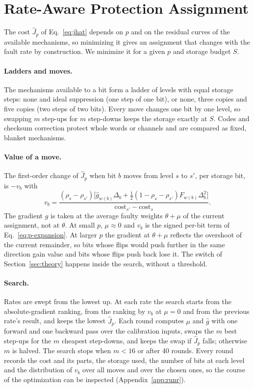 \section{Rate-Aware Protection Assignment}\label{sec:method}
The cost $\hat J_p$ of Eq.~\eqref{eq:jhat} depends on $p$ and on the residual curves of the available mechanisms, so minimizing it gives an assignment that changes with the fault rate by construction. We minimize it for a given $p$ and storage budget $S$.

\paragraph{Ladders and moves.} The mechanisms available to a bit form a ladder of levels with equal storage steps: none and ideal suppression (one step of one bit), or none, three copies and five copies (two steps of two bits). Every move changes one bit by one level, so swapping $m$ step-ups for $m$ step-downs keeps the storage exactly at $S$. Codes and checksum correction protect whole words or channels and are compared as fixed, blanket mechanisms.

\paragraph{Value of a move.} The first-order change of $\hat J_p$ when bit $b$ moves from level $s$ to $s'$, per storage bit, is $-v_b$ with
\begin{equation}\label{eq:value}
v_b=\frac{(\rho_s-\rho_{s'})\big[\hat g_{w(b)}\Delta_b+\tfrac12(1-\rho_s-\rho_{s'})F_{w(b)}\Delta_b^2\big]}{\mathrm{cost}_{s'}-\mathrm{cost}_s}.
\end{equation}
The gradient $\hat g$ is taken at the average faulty weights $\theta+\mu$ of the current assignment, not at $\theta$. At small $p$, $\mu\approx0$ and $v_b$ is the signed per-bit term of Eq.~\eqref{eq:p-expansion}. At larger $p$ the gradient at $\theta+\mu$ reflects the overshoot of the current remainder, so bits whose flips would push further in the same direction gain value and bits whose flips push back lose it. The switch of Section~\ref{sec:theory} happens inside the search, without a threshold.

\paragraph{Search.} Rates are swept from the lowest up. At each rate the search starts from the absolute-gradient ranking, from the ranking by $v_b$ at $\mu=0$ and from the previous rate's result, and keeps the lowest $\hat J_p$. Each round computes $\mu$ and $\hat g$ with one forward and one backward pass over the calibration inputs, swaps the $m$ best step-ups for the $m$ cheapest step-downs, and keeps the swap if $\hat J_p$ falls; otherwise $m$ is halved. The search stops when $m<16$ or after 40 rounds. Every round records the cost and its parts, the storage used, the number of bits at each level and the distribution of $v_b$ over all moves and over the chosen ones, so the course of the optimization can be inspected (Appendix~\ref{app:runr}).

